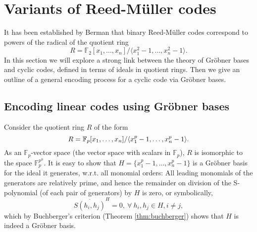 \documentclass[english,bachelor]{liumaiex}
\begin{document}
\section{Variants of Reed-M{\"u}ller codes}
It has been established by Berman \cite{berman} that binary Reed-M{\"u}ller codes correspond to powers of the radical of the quotient ring
\begin{displaymath}
R=\mathbb{F}_2[x_1,\dots,x_n]/\langle x_1^2-1,\dots,x_n^2-1\rangle.
\end{displaymath}
In this section we will explore a strong link between the theory of Gröbner bases and cyclic codes, defined in terms of ideals in quotient rings. Then we give an outline of a general encoding process for a cyclic code via Gröbner bases.

\subsection{Encoding linear codes using Gröbner bases}
Consider the quotient ring $R$ of the form
\begin{displaymath}
R=\mathbb{F}_p[x_1,\dots,x_n]/\langle x_1^p-1,\dots,x_n^p-1\rangle.
\end{displaymath}
As an $\mathbb{F}_p$-vector space (the vector space with scalars in $\mathbb{F}_p$), $R$ is isomorphic to the space $\mathbb{F}_p^{p^n}$. It is easy to show that $H=\{x_1^p-1,\dots,x_n^p-1\}$ is a Gröbner basis for the ideal it generates, w.r.t. all monomial orders: All leading monomials of the generators are relatively prime, and hence the remainder on division of the S-polynomial (of each pair of generators) by $H$ is zero, or symbolically,
\begin{displaymath}
\overline{S(h_i,h_j)}^H = 0, \ \forall \ h_i,h_j\in H, i\neq j,
\end{displaymath}
which by Buchberger's criterion (Theorem \ref{thm:buchberger}) shows that $H$ is indeed a Gröbner basis.
\end{document}
